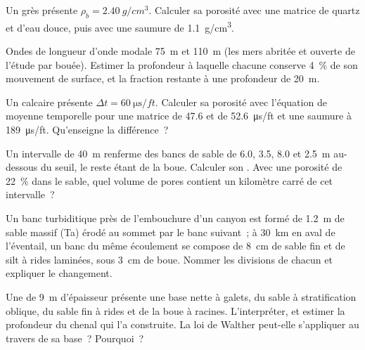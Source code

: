 \begin{exercise}[$\star$]\label{exo:b3:facies-models:3}
Un grès présente $\rho_b = \qty{2.40}{g/cm^3}$. Calculer sa porosité avec une
matrice de quartz et d'eau douce, puis avec une saumure de \qty{1.1}{g/cm^3}.
\end{exercise}

\begin{exercise}[$\star$]\label{exo:b3:facies-models:4}
Ondes de longueur d'onde modale \qty{75}{m} et \qty{110}{m} (les mers abritée
et ouverte de l'étude par bouée). Estimer la profondeur à laquelle chacune conserve
\qty{4}{\percent} de son mouvement de surface, et la fraction restante à une
profondeur de \qty{20}{m}.
\end{exercise}

\begin{exercise}[$\star\star$]\label{exo:b3:facies-models:5}
Un calcaire présente $\Delta t = \qty{60}{\micro\second/ft}$. Calculer sa
porosité avec l'équation de moyenne temporelle pour une matrice de 47.6 et de
\qty{52.6}{\micro\second/ft} et une saumure à \qty{189}{\micro\second/ft}.
Qu'enseigne la différence~?
\end{exercise}

\begin{exercise}[$\star\star$]\label{exo:b3:facies-models:6}
Un intervalle de \qty{40}{m} renferme des bancs de sable de 6.0, 3.5, 8.0 et \qty{2.5}{m}
au-dessous du seuil, le reste étant de la boue. Calculer son . Avec une
porosité de \qty{22}{\percent} dans le sable, quel volume de pores contient
un kilomètre carré de cet intervalle~?
\end{exercise}

\begin{exercise}[$\star\star$]\label{exo:b3:facies-models:7}
Un banc turbiditique près de l'embouchure d'un canyon est formé de \qty{1.2}{m} de sable massif
(Ta) érodé au sommet par le banc suivant~; à \qty{30}{km} en aval de l'éventail, un banc
du même écoulement se compose de \qty{8}{cm} de sable fin et de silt à rides laminées, sous
\qty{3}{cm} de boue. Nommer les divisions de chacun et expliquer le changement.
\end{exercise}

\begin{exercise}[$\star\star$]\label{exo:b3:facies-models:8}
Une  de \qty{9}{m} d'épaisseur présente une base nette à galets,
du sable à stratification oblique, du sable fin à rides et de la boue à racines. L'interpréter, et
estimer la profondeur du chenal qui l'a construite. La loi de Walther peut-elle
s'appliquer au travers de sa base~? Pourquoi~?
\end{exercise}

